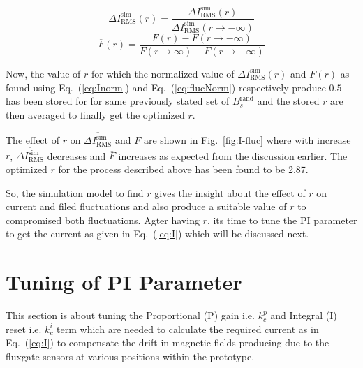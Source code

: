 \begin{equation}\label{eq:Inorm}
    \overline{\Delta I_{\text{RMS}}^{\text{sim}}}(r)=\frac{\Delta I_{\text{RMS}}^{\text{sim}}(r)}{\Delta I_{\text{RMS}}^{\text{sim}}(r\rightarrow - \infty)}
\end{equation}
\begin{equation}\label{eq:flucNorm}
    \overline{F}(r)=\frac{F(r)- F(r\rightarrow - \infty)}{F(r\rightarrow \infty)- F(r\rightarrow - \infty)}
\end{equation}

Now, the value of $r$ for which the normalized value of $\Delta I_{\text{RMS}}^{\text{sim}}(r)$ and $F(r)$  as found using Eq.~(\ref{eq:Inorm}) and Eq.~(\ref{eq:flucNorm}) respectively produce $0.5$ has been stored for for same previously stated set of $B_s^{\text{rand}}$ and the stored $r$ are then averaged to finally get the optimized $r$. 

The effect of $r$ on $\overline{\Delta I_{\text{RMS}}^{\text{sim}}}$ and $\overline{F}$ are shown in Fig.~\ref{fig:I-fluc} where with increase $r$, $\overline{\Delta I_{\text{RMS}}^{\text{sim}}}$ decreases and $\overline{F}$ increases as expected from the discussion earlier. The optimized $r$ for the process described above has been found to be 2.87.


\FloatBarrier

So, the simulation model to find $r$ gives the insight about the effect of $r$ on current and filed fluctuations and also produce a suitable value of $r$ to compromised both fluctuations. Agter having $r$, its time to tune the PI parameter to get the current as given in Eq.~(\ref{eq:I}) which will be discussed next.

\section{Tuning of PI Parameter}\label{sec:tune}
This section is about tuning the Proportional (P) gain i.e. $k_c^p$ and Integral (I) reset i.e. $k_c^i$ term which are needed to calculate the required current as in Eq.~(\ref{eq:I}) to compensate the drift in magnetic fields producing due to the fluxgate sensors at various positions within the prototype.



